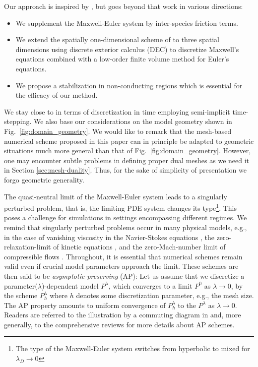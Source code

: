 \documentclass{article}
\begin{document}
Our approach is inspired by \cite{degond_2012}, but goes beyond that work in various directions:
\begin{itemize}
\item We supplement the Maxwell-Euler system by inter-species friction terms.
\item We extend the spatially one-dimensional scheme of \cite{degond_2012} to three
  spatial dimensions using discrete exterior calculus (DEC) to discretize Maxwell's
  equations combined with a low-order finite volume method for Euler's equations.
\item We propose a stabilization in non-conducting regions which is essential for the
  efficacy of our method.
\end{itemize}

We stay close to \cite{degond_2012} in terms of discretization in time employing
semi-implicit time-stepping. We also base our considerations on the model geometry shown
in Fig.~\ref{fig:domain_geometry}. We would like to remark that the mesh-based numerical
scheme proposed in this paper can in principle be adapted to geometric situations much
more general than that of Fig.~\ref{fig:domain_geometry}. However, one may encounter
subtle problems in defining proper dual meshes as we need it in Section
\ref{sec:mesh-duality}. Thus, for the sake of simplicity of presentation we forgo
geometric generality.

The quasi-neutral limit of the Maxwell-Euler system leads to a singularly perturbed
problem, that is, the limiting PDE system changes its type\footnote{The type of the
  Maxwell-Euler system switches from hyperbolic to mixed for $\lambda_{D}\to 0$}. This
poses a challenge for simulations in settings encompassing different regimes. We remind
that singularly perturbed problems occur in many physical models, e.g., in the case of
vanishing viscosity in the Navier-Stokes equations \cite{Kato_1984}, the
zero-relaxation-limit of kinetic equations \cite{jin_2010}, and the zero-Mach-number limit
of compressible flows \cite{degond_2007, haack_2010}. Throughout, it is essential that
numerical schemes remain valid even if crucial model parameters approach the limit. These
schemes are then said to be \emph{asymptotic-preserving} (AP): Let us assume that we
discretize a parameter($\lambda$)-dependent model $P^\lambda$, which converges to a limit
$P^0$ as $\lambda \rightarrow 0$, by the scheme $P^\lambda_h$ where $h$ denotes some
discretization parameter, e.g., the mesh size. The AP property amounts to uniform
convergence of $P^\lambda_h$ to the $P^\lambda$ as $\lambda\rightarrow0$. Readers are
referred to the illustration by a commuting diagram in \cite[][Fig.~1]{jin_2010} and, more
generally, to the comprehensive reviews \cite{jin_2010, degond_2017} for more details
about AP schemes.
\end{document}
